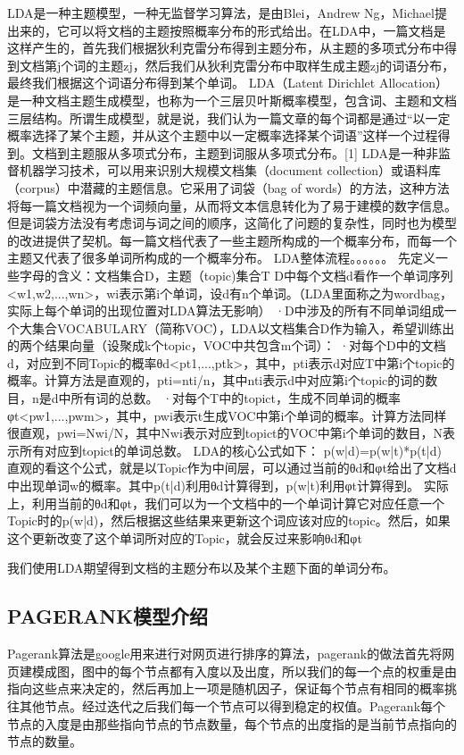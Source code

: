 \documentclass[master]{njuthesis}
\begin{document}
LDA是一种主题模型，一种无监督学习算法，是由Blei，Andrew Ng，Michael提出来的，它可以将文档的主题按照概率分布的形式给出。在LDA中，一篇文档是这样产生的，首先我们根据狄利克雷分布得到主题分布，从主题的多项式分布中得到文档第j个词的主题zj，然后我们从狄利克雷分布中取样生成主题zj的词语分布，最终我们根据这个词语分布得到某个单词。
LDA（Latent Dirichlet Allocation）是一种文档主题生成模型，也称为一个三层贝叶斯概率模型，包含词、主题和文档三层结构。所谓生成模型，就是说，我们认为一篇文章的每个词都是通过“以一定概率选择了某个主题，并从这个主题中以一定概率选择某个词语”这样一个过程得到。文档到主题服从多项式分布，主题到词服从多项式分布。[1] 
LDA是一种非监督机器学习技术，可以用来识别大规模文档集（document collection）或语料库（corpus）中潜藏的主题信息。它采用了词袋（bag of words）的方法，这种方法将每一篇文档视为一个词频向量，从而将文本信息转化为了易于建模的数字信息。但是词袋方法没有考虑词与词之间的顺序，这简化了问题的复杂性，同时也为模型的改进提供了契机。每一篇文档代表了一些主题所构成的一个概率分布，而每一个主题又代表了很多单词所构成的一个概率分布。
LDA整体流程。。。。。。
先定义一些字母的含义：文档集合D，主题（topic)集合T
D中每个文档d看作一个单词序列<w1,w2,...,wn>，wi表示第i个单词，设d有n个单词。（LDA里面称之为wordbag，实际上每个单词的出现位置对LDA算法无影响）
·D中涉及的所有不同单词组成一个大集合VOCABULARY（简称VOC），LDA以文档集合D作为输入，希望训练出的两个结果向量（设聚成k个topic，VOC中共包含m个词）：
·对每个D中的文档d，对应到不同Topic的概率θd<pt1,...,ptk>，其中，pti表示d对应T中第i个topic的概率。计算方法是直观的，pti=nti/n，其中nti表示d中对应第i个topic的词的数目，n是d中所有词的总数。
·对每个T中的topict，生成不同单词的概率φt<pw1,...,pwm>，其中，pwi表示t生成VOC中第i个单词的概率。计算方法同样很直观，pwi=Nwi/N，其中Nwi表示对应到topict的VOC中第i个单词的数目，N表示所有对应到topict的单词总数。
LDA的核心公式如下：
p(w|d)=p(w|t)*p(t|d)
直观的看这个公式，就是以Topic作为中间层，可以通过当前的θd和φt给出了文档d中出现单词w的概率。其中p(t|d)利用θd计算得到，p(w|t)利用φt计算得到。
实际上，利用当前的θd和φt，我们可以为一个文档中的一个单词计算它对应任意一个Topic时的p(w|d)，然后根据这些结果来更新这个词应该对应的topic。然后，如果这个更新改变了这个单词所对应的Topic，就会反过来影响θd和φt

我们使用LDA期望得到文档的主题分布以及某个主题下面的单词分布。

\subsection{PAGERANK模型介绍}

Pagerank算法是google用来进行对网页进行排序的算法，pagerank的做法首先将网页建模成图，图中的每个节点都有入度以及出度，所以我们的每一个点的权重是由指向这些点来决定的，然后再加上一项是随机因子，保证每个节点有相同的概率挑往其他节点。经过迭代之后我们每一个节点可以得到稳定的权值。Pagerank每个节点的入度是由那些指向节点的节点数量，每个节点的出度指的是当前节点指向的节点的数量。
\end{document}
